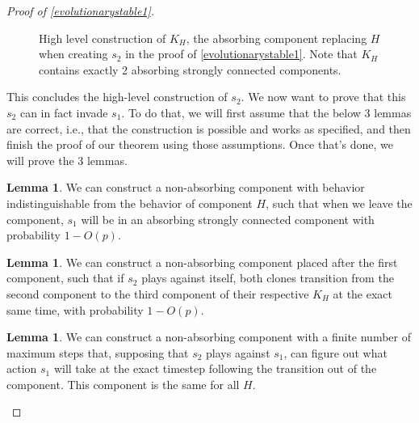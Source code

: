 \documentclass[11pt]{amsart}
\theoremstyle{definition}
\newtheorem{lemma}[theorem]{Lemma}
\theoremstyle{remark}
\begin{document}
\begin{proof}[Proof of \cref{evolutionarystable1}]
\begin{figure}
        \caption{High level construction of $K_H$, the absorbing component replacing $H$ when creating $s_2$ in the proof of \cref{evolutionarystable1}. Note that $K_H$ contains exactly 2 absorbing strongly connected components.}
        \label{c2flowchart}
      \end{figure}
      
      This concludes the high-level construction of $s_2$. We now want to prove that this $s_2$ can in fact invade $s_1$. To do that, we will first assume that the below 3 lemmas are correct, i.e., that the construction is possible and works as specified, and then finish the proof of our theorem using those assumptions. Once that's done, we will prove the 3 lemmas.

      \begin{lemma}
        \label{claimcanwaitfors1}
        We can construct a non-absorbing component with behavior indistinguishable from the behavior of component $H$, such that when we leave the component, $s_1$ will be in an absorbing strongly connected component with probability $1 - O(p)$.
      \end{lemma}

      \begin{lemma}
        \label{claimcansyncs2}
        We can construct a non-absorbing component placed after the first component, such that if $s_2$ plays against itself, both clones transition from the second component to the third component of their respective $K_H$ at the exact same time, with probability $1 - O(p)$.
      \end{lemma}

      \begin{lemma}
        \label{claimcanfigureout}
        We can construct a non-absorbing component with a finite number of maximum steps that, supposing that $s_2$ plays against $s_1$, can figure out what action $s_1$ will take at the exact timestep following the transition out of the component. This component is the same for all $H$.
      \end{lemma}


\end{proof}
\end{document}
